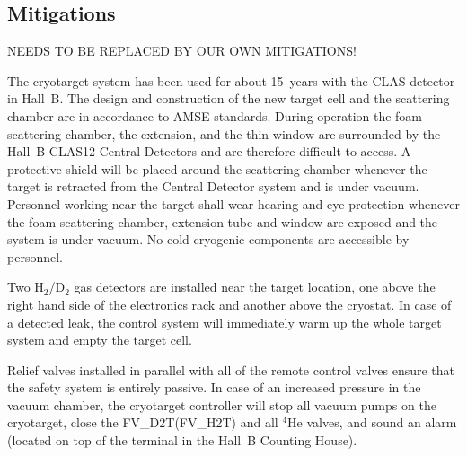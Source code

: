 %

\subsection{Mitigations}

NEEDS TO BE REPLACED BY OUR OWN MITIGATIONS!

The cryotarget system has been used for about 15~years with the CLAS detector in Hall~B. The 
design and construction of the new target cell and the scattering chamber are in accordance 
to AMSE standards. During operation the foam scattering chamber, the extension, and the thin 
window are surrounded by the Hall~B CLAS12 Central Detectors and are therefore difficult to 
access. A protective shield will be placed around the scattering chamber whenever the target 
is retracted from the Central Detector system and is under vacuum. Personnel working near the 
target shall wear hearing and eye protection whenever the foam scattering chamber, extension tube and window are 
exposed and the system is under vacuum. No cold cryogenic components are accessible by personnel. 

Two H$_2$/D$_2$ gas detectors are installed near the target location, one above the right hand 
side of the electronics rack and another above the cryostat. In case of a detected leak, the 
control system will immediately warm up the whole target system and empty the target cell.

Relief valves installed in parallel with all of the remote control valves ensure that the 
safety system is entirely passive. In case of an increased pressure in the vacuum chamber, 
the cryotarget controller will stop all vacuum pumps on the cryotarget, close the 
FV\_D2T(FV\_H2T) and all $^4$He valves, and sound an alarm (located on top of the terminal 
in the Hall~B Counting House).

